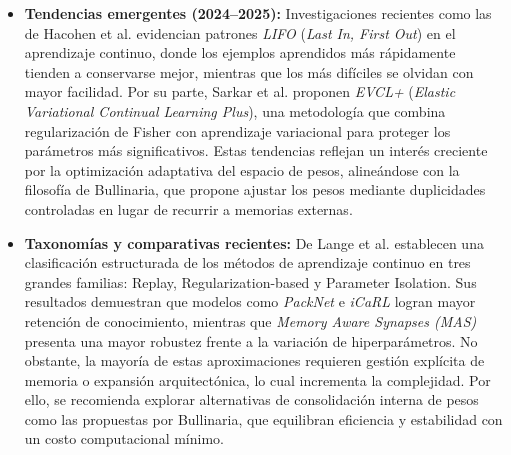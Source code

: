 \documentclass[10pt,a4paper]{article}
\begin{document}
\begin{itemize}
    \item \textbf{Tendencias emergentes (2024–2025):}  
    Investigaciones recientes como las de Hacohen et al. \cite{hacohenforgetting} evidencian patrones \textit{LIFO} (\textit{Last In, First Out}) en el aprendizaje continuo, donde los ejemplos aprendidos más rápidamente tienden a conservarse mejor, mientras que los más difíciles se olvidan con mayor facilidad.  
    Por su parte, Sarkar et al. \cite{sarkar2025adaptive} proponen \textit{EVCL+} (\textit{Elastic Variational Continual Learning Plus}), una metodología que combina regularización de Fisher con aprendizaje variacional para proteger los parámetros más significativos.  
    Estas tendencias reflejan un interés creciente por la optimización adaptativa del espacio de pesos, alineándose con la filosofía de Bullinaria, que propone ajustar los pesos mediante duplicidades controladas en lugar de recurrir a memorias externas.

    \item \textbf{Taxonomías y comparativas recientes:}  
    De Lange et al. \cite{de2021continual} establecen una clasificación estructurada de los métodos de aprendizaje continuo en tres grandes familias: Replay, Regularization-based y Parameter Isolation.  
    Sus resultados demuestran que modelos como \textit{PackNet} e \textit{iCaRL} logran mayor retención de conocimiento, mientras que \textit{Memory Aware Synapses (MAS)} presenta una mayor robustez frente a la variación de hiperparámetros.  
    No obstante, la mayoría de estas aproximaciones requieren gestión explícita de memoria o expansión arquitectónica, lo cual incrementa la complejidad.  
    Por ello, se recomienda explorar alternativas de consolidación interna de pesos como las propuestas por Bullinaria, que equilibran eficiencia y estabilidad con un costo computacional mínimo.
\end{itemize}
\end{document}
